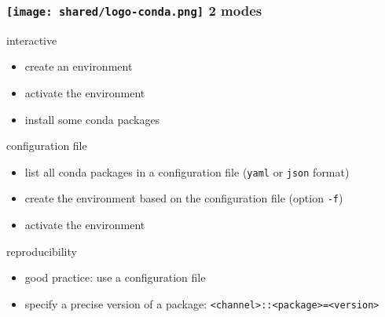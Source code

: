 \begin{frame}[containsverbatim]
\frametitle{\texttt{[image: shared/logo-conda.png]} 2 modes}
\begin{block}{interactive}
\begin{itemize}
    \item create an environment
    \item activate the environment
    \item install some conda packages
\end{itemize}
\end{block}
\begin{block}{configuration file}
\begin{itemize}
    \item list all conda packages in a configuration file (\verb|yaml| or \verb|json| format)
    \item create the environment based on the configuration file (option \verb|-f|)
    \item activate the environment
\end{itemize}
\end{block}
\begin{block}{reproducibility}
\begin{itemize}
    \item good practice: use a configuration file
    \item specify a precise version of a package:  \verb|<channel>::<package>=<version>| 
\end{itemize}
\end{block}
\end{frame}